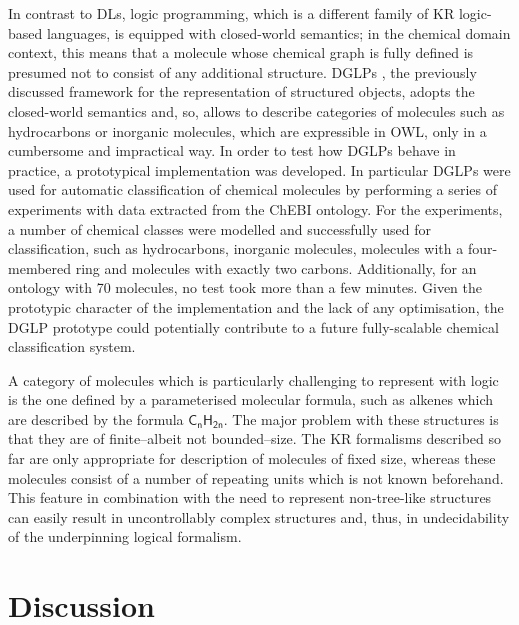 \documentclass[10pt]{bmc_article}
\newenvironment{bmcformat}{\baselineskip20pt\sloppy\setboolean{publ}{false}}{\baselineskip20pt\sloppy}
\begin{document}
\begin{bmcformat}
 In contrast to DLs, logic programming, which is a different family of KR logic-based languages, is equipped with closed-world semantics; in the chemical domain context, this means that a molecule whose chemical graph is fully defined is presumed not to consist of any additional structure. DGLPs \cite{magka2011}, the previously discussed framework for the representation of structured objects, adopts the closed-world semantics and, so, allows to describe categories of molecules such as hydrocarbons or inorganic molecules, which are expressible in  OWL, only in a cumbersome and impractical way. In order to test how DGLPs behave in practice, a prototypical implementation was developed. In particular DGLPs were used for automatic classification of chemical molecules by performing a series of experiments with data extracted from the ChEBI ontology. For the experiments, a number of chemical classes were modelled and successfully used for classification, such as hydrocarbons, inorganic molecules, molecules with a four-membered ring and molecules with exactly two carbons. Additionally, for an ontology with 70 molecules, no test took more than a few minutes. Given the prototypic character of the implementation and the lack of any optimisation, the DGLP prototype  could potentially contribute to a future fully-scalable chemical classification system.

A category of molecules which is particularly challenging to represent with logic is the one defined by a parameterised molecular formula, such as alkenes which are described by the formula $\mathsf{C_nH_{2n}}$. The major problem with these structures is that they are of finite--albeit not bounded--size. The KR formalisms described so far are only appropriate for description of molecules of fixed size, whereas these molecules consist of a number of repeating units which is not known beforehand.  This feature in combination with the need to represent non-tree-like structures can easily result in uncontrollably complex structures and, thus, in undecidability of the underpinning logical formalism. 

% 



\section*{Discussion}


\end{bmcformat}
\end{document}
